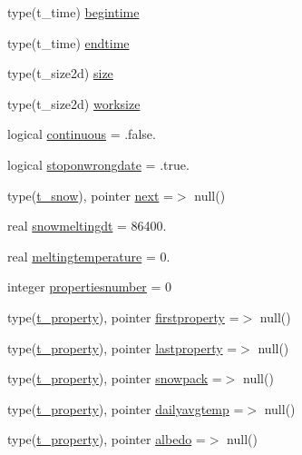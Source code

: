 \begin{DoxyCompactItemize}
type(t\+\_\+time) \mbox{\hyperlink{structmodulesnow_1_1t__snow_a8dfcd05aea4ac77d5f31c5b72f01473f}{begintime}}
\item 
type(t\+\_\+time) \mbox{\hyperlink{structmodulesnow_1_1t__snow_ab8a80e438250a0e0b2bc9589cb40c734}{endtime}}
\item 
type(t\+\_\+size2d) \mbox{\hyperlink{structmodulesnow_1_1t__snow_a158cdcc669b0f3e73960c59e32f99e70}{size}}
\item 
type(t\+\_\+size2d) \mbox{\hyperlink{structmodulesnow_1_1t__snow_a123524f9c9eb18a361baceea7ca5a725}{worksize}}
\item 
logical \mbox{\hyperlink{structmodulesnow_1_1t__snow_aaa3a4549a96cec531c37d716471ddc10}{continuous}} = .false.
\item 
logical \mbox{\hyperlink{structmodulesnow_1_1t__snow_a16c2a0efa75346f9b4eea7b59a5d3f13}{stoponwrongdate}} = .true.
\item 
type(\mbox{\hyperlink{structmodulesnow_1_1t__snow}{t\+\_\+snow}}), pointer \mbox{\hyperlink{structmodulesnow_1_1t__snow_ae21a4847261a8c9a509176a8d17ea5c4}{next}} =$>$ null()
\item 
real \mbox{\hyperlink{structmodulesnow_1_1t__snow_a5672ce348a0a3b2786c74f44e9d50649}{snowmeltingdt}} = 86400.
\item 
real \mbox{\hyperlink{structmodulesnow_1_1t__snow_a00611d45dfaf0742132dc7e476defd8a}{meltingtemperature}} = 0.
\item 
integer \mbox{\hyperlink{structmodulesnow_1_1t__snow_abdf96464f0aed100686641a6960f4658}{propertiesnumber}} = 0
\item 
type(\mbox{\hyperlink{structmodulesnow_1_1t__property}{t\+\_\+property}}), pointer \mbox{\hyperlink{structmodulesnow_1_1t__snow_ad5a018366b5eaf3355a85e5719ff5a92}{firstproperty}} =$>$ null()
\item 
type(\mbox{\hyperlink{structmodulesnow_1_1t__property}{t\+\_\+property}}), pointer \mbox{\hyperlink{structmodulesnow_1_1t__snow_a28f4fe133f2add18a9c6b3a21cee55ad}{lastproperty}} =$>$ null()
\item 
type(\mbox{\hyperlink{structmodulesnow_1_1t__property}{t\+\_\+property}}), pointer \mbox{\hyperlink{structmodulesnow_1_1t__snow_a3d74677f736c1497336da15a8cc3959b}{snowpack}} =$>$ null()
\item 
type(\mbox{\hyperlink{structmodulesnow_1_1t__property}{t\+\_\+property}}), pointer \mbox{\hyperlink{structmodulesnow_1_1t__snow_aa5465903567338bba5da178db6216107}{dailyavgtemp}} =$>$ null()
\item 
type(\mbox{\hyperlink{structmodulesnow_1_1t__property}{t\+\_\+property}}), pointer \mbox{\hyperlink{structmodulesnow_1_1t__snow_ae7172cbf3819662b17793e019b958944}{albedo}} =$>$ null()

\end{DoxyCompactItemize}
